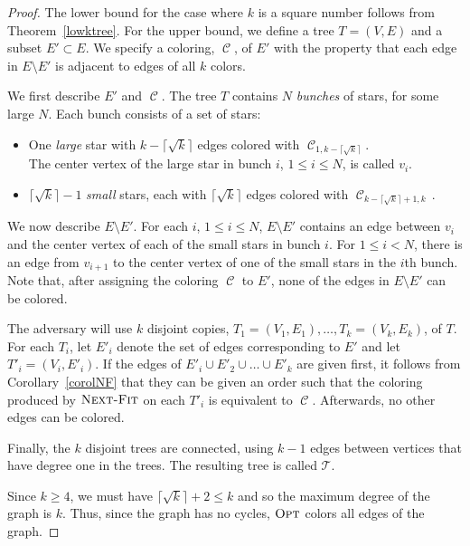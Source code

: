 \documentclass[smallextended]{svjour3}
\def\ceilk{\lceil\sqrt{k}\rceil}
\newcommand{\colorset}{\ensuremath{\operatorname{\mathcal{C}}}\xspace}
\newcommand{\coloring}{\ensuremath{\operatorname{\mathscr{C}}}\xspace}
\newcommand{\NF}{\ensuremath{\operatorname{\textsc{Next-Fit}}}\xspace}
\newcommand{\OPT}{\ensuremath{\operatorname{\textsc{Opt}}}\xspace}
\begin{document}
\begin{proof}
The lower bound for the case where $k$ is a square number follows from Theorem~\ref{lowktree}. 
For the upper bound, we define a tree $T=(V,E)$ and a subset
 $E' \subset E$.
We specify a coloring, \coloring, of $E'$ with the property that
 each edge in $E \setminus E'$ is adjacent to edges of all $k$ colors.

We first describe $E'$ and \coloring.
The tree $T$ contains $N$ \emph{bunches} of stars, for some large $N$. 
Each bunch consists of a set of stars:
\begin{itemize}
\item One {\em large} star with $k-{\ceilk}$ edges
  colored with $\colorset_{1,k-\ceilk}$.\\
 The center vertex of the large star in bunch $i$, $1 \leq i \leq N$, is
  called $v_i$.
\item ${\ceilk}-1$ {\em small} stars, each with $\ceilk$ edges
 colored with $\colorset_{k-\ceilk+1,k}$\,.
\end{itemize}

We now describe $E \setminus E'$.
For each $i$, $1 \leq i \leq N$, $E \setminus E'$ contains an edge between $v_i$ and the center vertex of each of the small stars in bunch $i$.
For $1 \leq i < N$, there is an edge from $v_{i+1}$ to the center vertex of one of the 
 small stars in the $i$th bunch. 
Note that, after assigning the coloring \coloring to $E'$, none of the
 edges in $E \setminus E'$ can be colored.

The adversary will use $k$ disjoint copies, $T_1=(V_1,E_1),\ldots , T_k=(V_k,E_k)$, of
 $T$. 
For each $T_i$, let $E'_i$ denote the set of edges corresponding to
 $E'$ and let $T'_i=(V_i,E'_i)$.
If the edges of $E'_i \cup E'_2 \cup \ldots \cup E'_k$ are given
 first, it follows from Corollary~\ref{corolNF} that they can be given
 an order such that the coloring produced by \NF on each $T'_i$ is
 equivalent to \coloring.
Afterwards, no other edges can be colored.

Finally, the $k$ disjoint trees are connected, using $k-1$ edges
 between vertices that have degree one in the trees.
The resulting tree is called $\mathcal{T}$.

Since $k\geq 4$, we must have $\ceilk +2\leq k$ and so the maximum
degree of the graph is $k$. 
Thus, since the graph has no cycles, \OPT colors all edges of the graph.


\end{proof}
\end{document}
